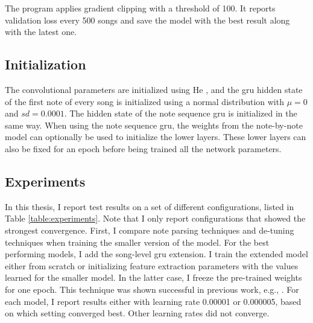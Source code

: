 The program applies gradient clipping \cite{pascanu2013difficulty} with a threshold of 100. It reports validation loss every 500 songs and save the model with the best result along with the latest one. 
\subsection{Initialization}
The convolutional parameters are initialized using He \cite{he2015delving}, and the \gls{gru} hidden state of the first note of every song is initialized using a normal distribution with $\mu=0$ and $sd=0.0001$. The hidden state of the note sequence \gls{gru} is initialized in the same way. When using the note sequence \gls{gru}, the weights from the note-by-note model can optionally be used to initialize the lower layers. These lower layers can also be fixed for an epoch before being trained all the network parameters. 

\subsection{Experiments}
\label{sec:experiment-list}
In this thesis, I report test results on a set of different configurations, listed in Table \ref{table:experiments}. Note that I only report configurations that showed the strongest convergence. First, I compare note parsing techniques and de-tuning techniques when training the smaller version of the model. For the best performing models, I add the song-level \gls{gru} extension. I train the extended model either from scratch or initializing feature extraction parameters with the values learned for the smaller model. In the latter case, I freeze the pre-trained weights for one epoch. This technique was shown successful in previous work, e.g., \cite{wager2020fully}. For each model, I report results either with learning rate 0.00001 or 0.000005, based on which setting converged best. Other learning rates did not converge.

